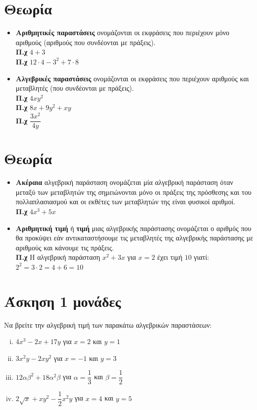 \documentclass[a4paper,10pt]{report}
\begin{document}
\section*{Θεωρία  \hfill \small{}}
\begin{itemize}
\item \textbf{Αριθμητικές παραστάσεις} ονομάζονται οι εκφράσεις που περιέχουν μόνο αριθμούς 
       (αριθμούς που συνδέονται με πράξεις).\\
       \textbf{Π.χ} $4+3$ \\
       \textbf{Π.χ} $12\cdot 4 -3^{2}+7\cdot 8$ 
\item \textbf{Αλγεβρικές παραστάσεις} ονομάζονται οι εκφράσεις που περιέχουν αριθμούς και μεταβλητές 
       (που συνδέονται με πράξεις).\\
       \textbf{Π.χ} $4xy^{2}$ \\
       \textbf{Π.χ} $8x+9y^{2}+xy$ \\
       \textbf{Π.χ} $\dfrac{3x^{2}}{4y}$ 
\end{itemize}


\section*{Θεωρία  \hfill \small{}}
\begin{itemize}
 \item \textbf{Ακέραια} αλγεβρική παράσταση ονομάζεται μία αλγεβρική παράσταση όταν μεταξύ των 
        μεταβλητών της σημειώνονται μόνο οι πράξεις της πρόσθεσης και του πολλαπλασιασμού και 
        οι εκθέτες των μεταβλητών της είναι φυσικοί αριθμοί.\\
        \textbf{Π.χ} $4x^{3}+5x$
 \item \textbf{Αριθμητική τιμή} ή \textbf{τιμή} μιας αλγεβρικής παράστασης ονομάζεται ο αριθμός που 
        θα προκύψει εάν αντικαταστήσουμε τις μεταβλητές της αλγεβρικής παράστασης με αριθμούς και 
        κάνουμε τις πράξεις.\\
        \textbf{Π.χ} Η αλγεβρική παράσταση $x^{2}+3x$ για $x=2$ έχει τιμή $10$ γιατί: $2^{2}=3\cdot 2=4+6=10$
\end{itemize}



\section*{Άσκηση 1  \hfill \small{ μονάδες}}
Να βρείτε την αλγεβρική τιμή των παρακάτω αλγεβρικών παραστάσεων:
\begin{enumerate}[i)]
 \item $4x^{3}-2x+17y$ για $x=2$ και $y=1$
 \item $3x^{2}y-2xy^{2}$ για $x=-1$ και $y=3$ 
 \item $12αβ^{2}+18α^{2}β$ για $α=\dfrac{1}{3}$  και $β=\dfrac{1}{2}$
 \item $2\sqrt{x}+xy^{2}-\dfrac{1}{2}x^{2}y$ για $x=4$ και $y=5$
\end{enumerate}
\end{document}
